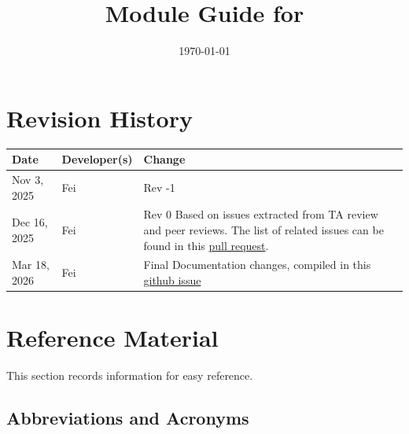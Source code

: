 \documentclass[12pt, titlepage]{article}
\begin{document}
\title{Module Guide for \progname{}}
\author{\authname}
\date{\today}

\maketitle


\section{Revision History}

\begin{table}[hp]
\begin{tabularx}{\textwidth}{llX}
\toprule
\textbf{Date} & \textbf{Developer(s)} & \textbf{Change}\\
\midrule
Nov 3, 2025 & Fei & Rev -1\\
Dec 16, 2025 & Fei & Rev 0 Based on issues extracted from TA review and peer reviews. The list of related issues can be found in this \href{https://github.com/thaafei/DomainX/pull/307}{pull request}. \\
Mar 18, 2026 & Fei & Final Documentation changes, compiled in this \href{https://github.com/thaafei/DomainX/issues/497}{github issue} \\
\bottomrule
\end{tabularx}
\end{table}

\newpage

\section{Reference Material}

This section records information for easy reference.

\subsection{Abbreviations and Acronyms}
\end{document}
